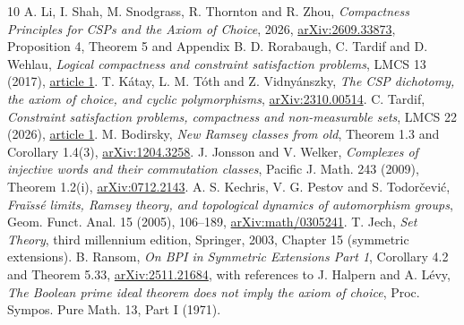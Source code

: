 \documentclass[11pt]{article}
\begin{document}
\begin{thebibliography}{10}
 A. Li, I. Shah, M. Snodgrass, R. Thornton and R. Zhou,
\emph{Compactness Principles for CSPs and the Axiom of Choice}, 2026,
\href{https://arxiv.org/pdf/2609.33873}{arXiv:2609.33873}, Proposition 4, Theorem 5 and Appendix B.
 D. Rorabaugh, C. Tardif and D. Wehlau, \emph{Logical compactness and constraint satisfaction problems}, LMCS 13 (2017), \href{https://doi.org/10.23638/LMCS-13(1:1)2017}{article 1}.
 T. K\'atay, L. M. T\'oth and Z. Vidny\'anszky, \emph{The CSP dichotomy, the axiom of choice, and cyclic polymorphisms}, \href{https://arxiv.org/abs/2310.00514}{arXiv:2310.00514}.
 C. Tardif, \emph{Constraint satisfaction problems, compactness and non-measurable sets}, LMCS 22 (2026), \href{https://doi.org/10.46298/lmcs-22(3:1)2026}{article 1}.
 M. Bodirsky, \emph{New Ramsey classes from old}, Theorem 1.3 and Corollary 1.4(3), \href{https://arxiv.org/abs/1204.3258}{arXiv:1204.3258}.
 J. Jonsson and V. Welker, \emph{Complexes of injective words and their commutation classes}, Pacific J. Math. 243 (2009), Theorem 1.2(i), \href{https://arxiv.org/abs/0712.2143}{arXiv:0712.2143}.
 A. S. Kechris, V. G. Pestov and S. Todor\v cevi\'c, \emph{Fra\"iss\'e limits, Ramsey theory, and topological dynamics of automorphism groups}, Geom. Funct. Anal. 15 (2005), 106--189, \href{https://arxiv.org/abs/math/0305241}{arXiv:math/0305241}.
 T. Jech, \emph{Set Theory}, third millennium edition, Springer, 2003, Chapter 15 (symmetric extensions).
 B. Ransom, \emph{On BPI in Symmetric Extensions Part 1}, Corollary 4.2 and Theorem 5.33, \href{https://arxiv.org/abs/2511.21684}{arXiv:2511.21684}, with references to J. Halpern and A. L\'evy, \emph{The Boolean prime ideal theorem does not imply the axiom of choice}, Proc. Sympos. Pure Math. 13, Part I (1971).
\end{thebibliography}
\end{document}
